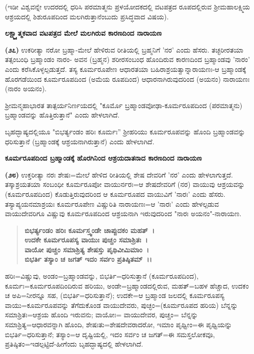 (ಇಡೀ ವಿಶ್ವವನ್ನೇ ಉದರದಲ್ಲಿ ಧರಿಸಿ ಪರಮಾತ್ಮನು ಪ್ರಳಯೋದಕದಲ್ಲಿ ವಟಪತ್ರದ ರೂಪದಲ್ಲಿರುವ ಶ‍್ರೀಮಹಾಲಕ್ಷ್ಮಿಯ ಆಶ್ರಯದಲ್ಲಿ ಶಿಶುರೂಪದಿಂದ ಮಲಗಿರುತ್ತಾನೆಂಬುದು ಪ್ರಸಿದ್ಧವಾದ ವಿಷಯ).

\begin{center}
\textbf{ಲಕ್ಷ್ಮ್ಯಾತ್ಮಕವಾದ ವಟಪತ್ರದ ಮೇಲೆ ಮಲಗಿರುವ ಕಾರಣದಿಂದ ನಾರಾಯಣ}
\end{center}

\textbf{(೨೭)} ಉಕರೀತ್ಯಾ ನರೋ ಬ್ರಹ್ಮಾ-ಮೇಲೆ ಹೇಳಿರುವ ರೀತಿಯಲ್ಲಿ ಬ್ರಹ್ಮನಿಗೆ 'ನರ' ಎಂದು ಹೆಸರು. ತಚ್ಛರೀರತಯಾ ತತ್ಸಂಬಂಧಿ ಬ್ರಹ್ಮಾಂಡಂ ನಾರಂ- ಅವನ (ಬ್ರಹ್ಮನ) ಶರೀರಸಂಬಂಧ ಹೊಂದಿರುವ ಕಾರಣದಿಂದ ಬ್ರಹ್ಮಾಂಡವು 'ನಾರಂ' ಎಂದು ಕರೆಸಿಕೊಳ್ಳಲ್ಪಡುತ್ತದೆ. ತಸ್ಯ ಕೂರ್ಮರೂಪೇಣ ಆಧಾರತಯಾ ಬಹಿರಾಶ್ರಯತ್ವಾನ್ನಾರಾಯಣಃ-ಆ ಬ್ರಹ್ಮಾಂಡಕ್ಕೆ ಹೊರಗಡೆಯಿಂದ ಕೂರ್ಮರೂಪದಿಂದ (ಅಮೆಯ ರೂಪದಿಂದ) ಆಧಾರನಾಗಿರುವುದರಿಂದ (ಅಯನಂ) ನಾರಾಯಣಃ (ನಾರಂ ಅಯನಂ).

 ಶ‍್ರೀಮನ್ಮಹಾಭಾರತ ತಾತ್ಪರ್ಯನಿರ್ಣಯದಲ್ಲಿ "ಕೂರ್ಮೊ ಬ್ರಹ್ಮಾಂಡವೋಢಾ-ಕೂರ್ಮ\-ರೂಪದಿಂದ (ಪರಮಾತ್ಮನು) ಬ್ರಹ್ಮಾಂಡವನ್ನು ಹೊತ್ತಿರುತ್ತಾನೆ" ಎಂದು ಹೇಳಲಾಗಿದೆ.

ಬೃಹದ್ಭಾಷ್ಯದಲ್ಲಿಯೂ "ಬಿಭರ್ತ್ಯಂಡಂ ಹರಿಃ ಕೂರ್ಮಃ'' ಶ‍್ರೀಹರಿಯು ಕೂರ್ಮರೂಪವನ್ನು ಹೊಂದಿ ಬ್ರಹ್ಮಾಂಡವನ್ನು ಧರಿಸುತ್ತಾನೆ (ಬ್ರಹ್ಮಾಂಡಕ್ಕೆ ಆಶ್ರಯನಾಗಿರುತ್ತಾನೆ) ಎಂದು ಹೇಳಲಾಗಿದೆ.

\begin{center}
\textbf{ಕೂರ್ಮರೂಪದಿಂದ ಬ್ರಹ್ಮಾಂಡಕ್ಕೆ ಹೊರಗಿನಿಂದ ಆಶ್ರಯದಾತನಾದ ಕಾರಣದಿಂದ ನಾರಾಯಣ}
\end{center}

\textbf{(೨೮)} ಉಕ್ತರೀತ್ಯಾ ನರಃ ಶೇಷಃ=ಮೇಲೆ ಹೇಳಿದ ರೀತಿಯಲ್ಲಿ ಶೇಷ ದೇವರಿಗೆ 'ನರ' ಎಂದು ಹೇಳಲಾಗುತ್ತದೆ. ತಸ್ಕಾಶ್ರಯತಯಾ ಸಂಬಂಧೀ ಕೂರ್ಮರೂಪೋ ವಾಯು\-ರ್ನರಃ=ಆ ಶೇಷದೇವರಿಗೆ (ನರ) ವಾಯುವು ಆಶ್ರಯವನ್ನು (ಕೂರ್ಮರೂಪದಿಂದ) ಕೊಡುತ್ತಿರುವುದರಿಂದ ಆ ಕೂರ್ಮರೂಪದ ವಾಯುವಿಗೆ 'ನಾರಃ' ಎಂದು ಹೆಸರು. ತಸ್ಯಾಪ್ಯಯನಮಾಶ್ರಯಃ ಕೂರ್ಮರೂಪೇಣ ವಿಷ್ಣುರಿತಿ ನಾರಾಯಣಃ=ಆ 'ನಾರಃ' ಎಂದು ಹೇಳಲ್ಪಡುವ ವಾಯುದೇವರಿಗೂ ವಿಷ್ಣುವು ಕೂರ್ಮರೂಪದಿಂದ ಆಶ್ರಯನಾಗಿ ಇರುವುದರಿಂದ "ನಾರಃ ಅಯನಂ"-ನಾರಾಯಣ.

\begin{verse}
\textbf{ಬಿಭರ್ತ್ಯಂಡಂ ಹರಿಃ ಕೂರ್ಮಸ್ತ್ವಂಡೇ ಚಾಪ್ಪುದಕಂ ಮಹತ್~।}\\\textbf{ಉದಕೇ ಕೂರ್ಮರೂಪಸ್ಯ ವಾಯುಃ ಪುಚ್ಚಂ ಸಮಾಶ್ರಿತಃ~।}\\\textbf{ವಾಯೋ ಪುಚ್ಚಂ ಸಮಾಶ್ರಿತ್ಯ ಶೇಷಸ್ತು ಪೃಥಿವೀಮಿಮಾಂ~।}\\\textbf{ಬಿಭರ್ತಿ ತಸ್ಯಾಂ ಚ ಜಗತ್ ಇದಂ ಸರ್ವಂ ಪ್ರತಿಷ್ಠಿತಮ್~।।}
\end{verse}

ಹರಿಃ=ವಿಷ್ಣುವು, ಅಂಡಂ=ಬ್ರಹ್ಮಾಂಡವನ್ನು, ಬಿಭರ್ತಿ=ಧರಿಸುತ್ತಾನೆ (ಕೂರ್ಮರೂಪದಿಂದ), ಕೂರ್ಮಃ=ಕೂರ್ಮರೂಪದಿಂದಿರುವ ಹರಿಯು, ಅಂಡೇ=ಬ್ರಹ್ಮಾಂಡದಲ್ಲಿರುವ, ಮಹತ್=ಬಹಳ ಹೆಚ್ಚಾದ, ಉದಕಂ ಚ ಅಪಿ=ನೀರನ್ನೂ ಸಹ, (ಬಿಭರ್ತಿ=ಧರಿಸುತ್ತಾನೆ); ಉದಕೇ=ಆ ಬ್ರಹ್ಮಾಂಡ ಜಲದಲ್ಲಿ ಕೂರ್ಮರೂಪಸ್ಯ ವಾಯು=ಕೂರ್ಮರೂಪವನ್ನು ತೆಗೆದುಕೊಂಡ ವಾಯುದೇವರು, ಪುಚ್ಛಂ=(ಕೂರ್ಮರೂಪದ ಹರಿಯ) ಬೆನ್ನನ್ನು ಸಮಾಶ್ರಿತಃ=\-ಆಶ್ರಯ ಹೊಂದಿ ಇರುವನು; ವಾಯೋಃ= ವಾಯುದೇವರ, ಪುಚ್ಚಂ= ಬೆನ್ನನ್ನು ಸಮಾಶ್ರಿತ್ಯ=\-ಆಧಾರವನ್ನಾಗಿ ಹೊಂದಿ, ಶೇಷಃತು=ಶೇಷದೇವರಾದರೋ, ಇಮಾಂ ಪೃಥ್ವೀಂ=ಈ ಪೃಥ್ವಿಯನ್ನು ಬಿಭರ್ತಿ=ಧರಿಸುತ್ತಾನೆ; ತಸ್ಯಾಂ=ಆ ದೃಷ್ಟಿಯಲ್ಲಿ, ಇದಂ ಸರ್ವಂ ಚ ಜಗತ್=ಈ ಸಮಸ್ತಲೋಕವೂ, ಪ್ರತಿಷ್ಠಿತಂ=ಇಡಲ್ಪಟ್ಟಿದೆ-ಹೀಗೆಂದು ಬೃಹದ್ಭಾಷ್ಯದಲ್ಲಿ ಹೇಳಲಾಗಿದೆ.

